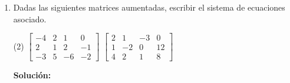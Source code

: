 \documentclass[12pt]{article}
\newenvironment{solucion}
{\begin{mdframed}[backgroundcolor=black!10]
		{\bf Solución:}\\
	}
	{
	\end{mdframed}
}
\newenvironment{preguntas}
{\begin{enumerate}\itemsep12pt
	}
	{
	\end{enumerate}
}
\newcommand{\ra}{\rightarrow}
\newcommand{\widesim}[2][1.5]{
	\mathrel{\overset{#2}{\scalebox{#1}[1]{$\sim$}}}
}
\newcommand{\wsim}{\widesim{}}
\begin{document}
\begin{preguntas}
\begin{solucion}
\begin{enumerate}[a)]
\item $
			\begin{bmatrix}
			1 & h & 4\\
			3 & 6 & 8
			\end{bmatrix}
			\wsim
			\begin{bmatrix}
			1 & h & 4\\
			0 & 6-3h & -4
			\end{bmatrix}
			$\\\\
		    Para que el sistema sea consistente, $6 - 3h$ no puede ser $0$, es decir
			$$6 - 3h \neq 0 \ra h \neq 2$$
\item $
			\begin{bmatrix}
			-4 & 12 & h\\
			2 & -6 & -3
			\end{bmatrix}
			\wsim
			\begin{bmatrix}
			-4 & 12 & h\\
			0 & 0 & -3 - \frac{h}{2}
			\end{bmatrix}
			$\\\\
			En este caso, el último coeficiente debe ser 0, para que el sistema sea consistente,
			$$-3 - \dfrac{h}{2} = 0 \ra 3 = -\dfrac{h}{2} \ra 6 = -h \ra h = -6$$
\end{enumerate}
\end{solucion}
\item Dadas las siguientes matrices aumentadas, escribir el sistema de ecuaciones asociado.
\begin{tasks}(2)
\task $
		\begin{bmatrix}
		-4 & 2 & 1 &  0\\
		2  & 1 & 2 & -1\\
		-3 & 5 &-6& -2
		\end{bmatrix}
		$
\task $
		\begin{bmatrix}
		2 & 1 & -3 & 0\\
		1  & -2 & 0 & 12\\
		4 & 2 &1& 8
		\end{bmatrix}
		$
\end{tasks}
\begin{solucion}


\end{solucion}
\end{preguntas}
\end{document}
